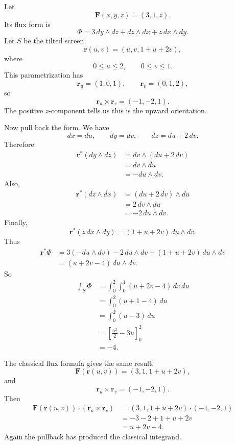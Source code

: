Let
\[
    \mathbf F(x,y,z)=(3,1,z).
\]
Its flux form is
\[
    \Phi
    =
    3\,dy\wedge dz
    +
    dz\wedge dx
    +
    z\,dx\wedge dy.
\]
Let \(S\) be the tilted screen
\[
    \mathbf r(u,v)=(u,v,1+u+2v),
\]
where
\[
    0\le u\le2,
    \qquad
    0\le v\le1.
\]
This parametrization has
\[
    \mathbf r_u=(1,0,1),
    \qquad
    \mathbf r_v=(0,1,2),
\]
so
\[
    \mathbf r_u\times\mathbf r_v=(-1,-2,1).
\]
The positive \(z\)-component tells us this is the upward orientation.

Now pull back the form.  We have
\[
    dx=du,
    \qquad
    dy=dv,
    \qquad
    dz=du+2\,dv.
\]
Therefore
\[
\begin{aligned}
    \mathbf r^*(dy\wedge dz)
    &=
    dv\wedge(du+2\,dv)\\
    &=
    dv\wedge du\\
    &=
    -du\wedge dv.
\end{aligned}
\]
Also,
\[
\begin{aligned}
    \mathbf r^*(dz\wedge dx)
    &=
    (du+2\,dv)\wedge du\\
    &=
    2\,dv\wedge du\\
    &=
    -2\,du\wedge dv.
\end{aligned}
\]
Finally,
\[
    \mathbf r^*(z\,dx\wedge dy)
    =
    (1+u+2v)\,du\wedge dv.
\]
Thus
\[
\begin{aligned}
    \mathbf r^*\Phi
    &=
    3(-du\wedge dv)
    -
    2\,du\wedge dv
    +
    (1+u+2v)\,du\wedge dv\\
    &=
    (u+2v-4)\,du\wedge dv.
\end{aligned}
\]
So
\[
\begin{aligned}
    \int_S\Phi
    &=
    \int_0^2\int_0^1 (u+2v-4)\,dv\,du\\
    &=
    \int_0^2 (u+1-4)\,du\\
    &=
    \int_0^2 (u-3)\,du\\
    &=
    \left[\frac{u^2}{2}-3u\right]_0^2\\
    &=
    -4.
\end{aligned}
\]

The classical flux formula gives the same result:
\[
    \mathbf F(\mathbf r(u,v))=(3,1,1+u+2v),
\]
and
\[
    \mathbf r_u\times\mathbf r_v=(-1,-2,1).
\]
Then
\[
\begin{aligned}
    \mathbf F(\mathbf r(u,v))\cdot(\mathbf r_u\times\mathbf r_v)
    &=
    (3,1,1+u+2v)\cdot(-1,-2,1)\\
    &=
    -3-2+1+u+2v\\
    &=
    u+2v-4.
\end{aligned}
\]
Again the pullback has produced the classical integrand.

